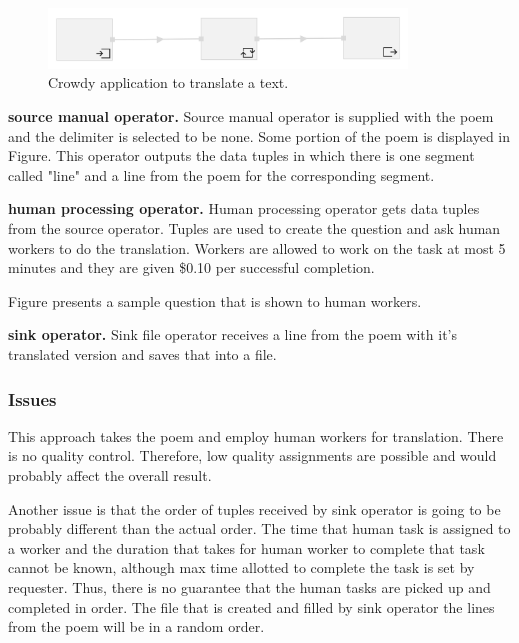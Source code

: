 \begin{figure}[ht]
	\centering
	\includegraphics[width=0.85\textwidth]{figures/scenarios/naive.png}
	\caption{Crowdy application to translate a text.}
	\label{fig:scenario2}
\end{figure}

\textbf{source manual operator.}
Source manual operator is supplied with the poem and the delimiter is selected to be none. Some portion of the poem is displayed in Figure. This operator outputs the data tuples in which there is one segment called "line" and a line from the poem for the corresponding segment.


\textbf{human processing operator.}
Human processing operator gets data tuples from the source operator. Tuples are used to create the question and ask human workers to do the translation. Workers are allowed to work on the task at most 5 minutes and they are given \$0.10 per successful completion.

Figure presents a sample question that is shown to human workers.


\textbf{sink operator.}
Sink file operator receives a line from the poem with it's translated version and saves that into a file.


\subsubsection{Issues}
This approach takes the poem and employ human workers for translation. There is no quality control. Therefore, low quality assignments are possible and would probably affect the overall result.

Another issue is that the order of tuples received by sink operator is going to be probably different than the actual order. The time that human task is assigned to a worker and the duration that takes for human worker to complete that task cannot be known, although max time allotted to complete the task is set by requester. Thus, there is no guarantee that the human tasks are picked up and completed in order. The file that is created and filled by sink operator the lines from the poem will be in a random order.

